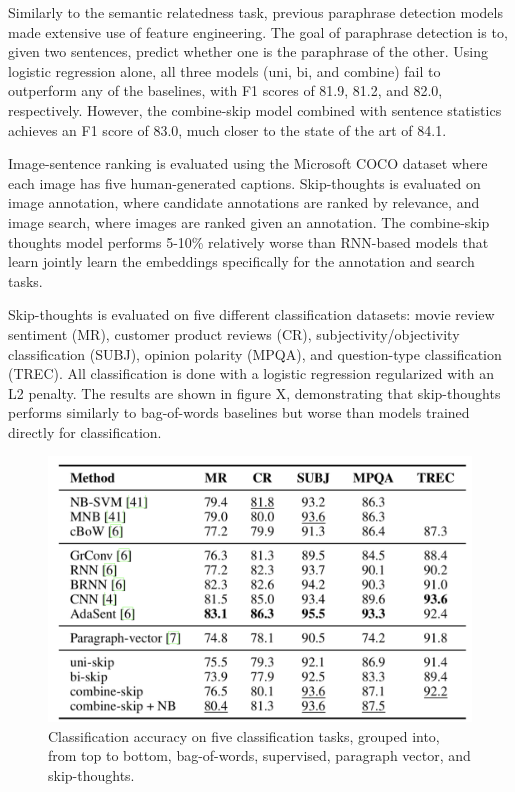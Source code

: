 Similarly to the semantic relatedness task, previous paraphrase detection models made extensive use of feature engineering. The goal of paraphrase detection is to, given two sentences, predict whether one is the paraphrase of the other. Using logistic regression alone, all three models (uni, bi, and combine) fail to outperform any of the baselines, with F1 scores of 81.9, 81.2, and 82.0, respectively. However,  the combine-skip model combined with sentence statistics achieves an F1 score of 83.0, much closer to the state of the art of 84.1.

Image-sentence ranking is evaluated using the Microsoft COCO dataset where each image has five human-generated captions. Skip-thoughts is evaluated on image annotation, where candidate annotations are ranked by relevance, and image search, where images are ranked given an annotation. The combine-skip thoughts model performs 5-10\% relatively worse than RNN-based models that learn jointly learn the embeddings specifically for the annotation and search tasks. 

Skip-thoughts is evaluated on five different classification datasets: movie review sentiment (MR), customer product reviews (CR), subjectivity/objectivity classification (SUBJ), opinion polarity (MPQA), and question-type classification (TREC). All classification is done with a logistic regression regularized with an L2 penalty. The results are shown in figure X, demonstrating that skip-thoughts performs similarly to bag-of-words baselines but worse than models trained directly for classification.


\begin{figure}[h!]
\centering
  \includegraphics[width=.7\linewidth]{files/skipthoughts-8.png}
  \caption{Classification accuracy on five classification tasks, grouped into, from top to bottom, bag-of-words, supervised, paragraph vector, and skip-thoughts.}
  \label{fig:vae}
\end{figure}

